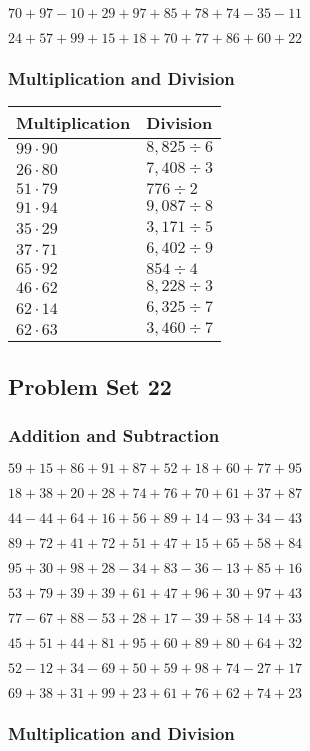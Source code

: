 \(70+97-10+29+97+85+78+74-35-11\)

\(24+57+99+15+18+70+77+86+60+22\)

\hypertarget{multiplication-and-division-61}{%
\subsubsection{Multiplication and
Division}\label{multiplication-and-division-61}}

\begin{longtable}[]{@{}ll@{}}
\toprule
Multiplication & Division\tabularnewline
\midrule
\endhead
\(99\cdot90\) & \(8,825÷6\)\tabularnewline
\(26\cdot80\) & \(7,408÷3\)\tabularnewline
\(51\cdot79\) & \(776÷2\)\tabularnewline
\(91\cdot94\) & \(9,087÷8\)\tabularnewline
\(35\cdot29\) & \(3,171÷5\)\tabularnewline
\(37\cdot71\) & \(6,402÷9\)\tabularnewline
\(65\cdot92\) & \(854÷4\)\tabularnewline
\(46\cdot62\) & \(8,228÷3\)\tabularnewline
\(62\cdot14\) & \(6,325÷7\)\tabularnewline
\(62\cdot63\) & \(3,460÷7\)\tabularnewline
\bottomrule
\end{longtable}

\hypertarget{problem-set-22-1}{%
\subsection{Problem Set 22}\label{problem-set-22-1}}

\hypertarget{addition-and-subtraction-62}{%
\subsubsection{Addition and
Subtraction}\label{addition-and-subtraction-62}}

\(59+15+86+91+87+52+18+60+77+ 95\)

\(18+38+20+28+74+76+70+61+37+87\)

\(44-44+64+16+56+89+14-93+34-43\)

\(89+72+41+72+51+47+15+65+58+84\)

\(95+30+98+28-34+83-36-13+85+16\)

\(53+79+39+39+61+47+96+30+97+43\)

\(77-67+88-53+28+17-39+58+14+33\)

\(45+51+44+81+95+60+89+80+64+32\)

\(52-12+34-69+50+59+98+74-27+17\)

\(69+38+31+99+23+61+76+62+74+23\)

\hypertarget{multiplication-and-division-62}{%
\subsubsection{Multiplication and
Division}\label{multiplication-and-division-62}}

